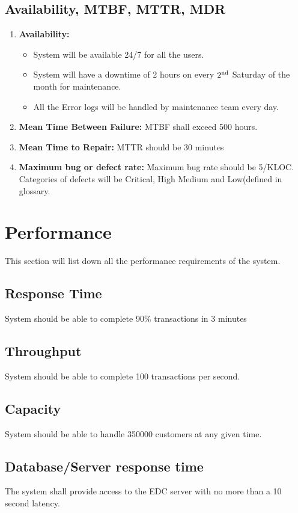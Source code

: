 \documentclass{article}
\begin{document}
\subsection{Availability, MTBF, MTTR, MDR}
\begin{enumerate}
    \item \textbf{Availability:}
    \begin{itemize}
        \item System will be available 24/7 for all the users.
        \item System will have a downtime of 2 hours on every $2\textsuperscript{nd}$ Saturday of the month for maintenance.
        \item All the Error logs will be handled by maintenance team every day.
    \end{itemize}
    \item \textbf{Mean Time Between Failure:} MTBF shall exceed 500 hours.
    \item \textbf{Mean Time to Repair:} MTTR should be 30 minutes
    \item \textbf{Maximum bug or defect rate:} Maximum bug rate should be 5/KLOC. Categories of defects will be Critical, High Medium and Low(defined in glossary.
\end{enumerate}


\section{ Performance}
This section will list down all the performance requirements of the system.
\subsection{Response Time}
System should be able to complete 90\% transactions in 3 minutes
\subsection{Throughput}
System should be able to complete 100 transactions per second.
\subsection{Capacity}
System should be able to handle 350000 customers at any given time.
\subsection{Database/Server response time}
The system shall provide access to the EDC server with no more than a 10 second latency.
\end{document}
